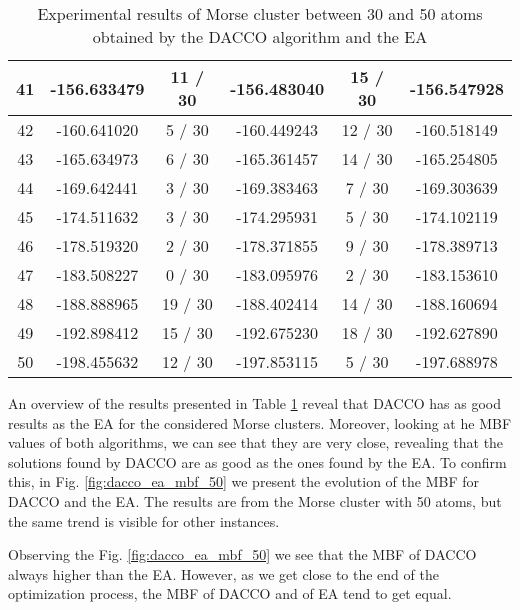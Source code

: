\begin{table}[!htdp]
\begin{center}
\begin{tabular}{| c | c | c | c | c | c |}
						41 & -156.633479 & 11 / 30 & -156.483040 & 15 / 30 & -156.547928 \\ \hline
						42 & -160.641020 & 5 / 30 & -160.449243 & 12 / 30 & -160.518149 \\ \hline
						43 & -165.634973 & 6 / 30 & -165.361457 & 14 / 30 & -165.254805 \\ \hline
						44 & -169.642441 & 3 / 30 & -169.383463 & 7 / 30 & -169.303639 \\ \hline
						45 & -174.511632 & 3 / 30 & -174.295931 & 5 / 30 & -174.102119 \\ \hline
						46 & -178.519320 & 2 / 30 & -178.371855 & 9 / 30 & -178.389713 \\ \hline
						47 & -183.508227 & 0 / 30 & -183.095976 & 2 / 30 & -183.153610 \\ \hline
						48 & -188.888965 & 19 / 30 & -188.402414 & 14 / 30 & -188.160694 \\ \hline
						49 & -192.898412 & 15 / 30 & -192.675230 & 18 / 30 & -192.627890 \\ \hline
						50 & -198.455632 & 12 / 30 & -197.853115 & 5 / 30 & -197.688978 \\ \hline
					\end{tabular}
				\end{center}
				\caption{Experimental results of Morse cluster between 30 and 50 atoms obtained by the DACCO algorithm and the EA}
				\label{tab:dacco_vs_ea}
			\end{table}
			
			An overview of the results presented in Table \ref{tab:dacco_vs_ea} reveal that DACCO has as good results as the EA for the considered Morse clusters. Moreover, looking at he MBF values of both algorithms, we can see that they are very close, revealing that the solutions found by DACCO are as good as the ones found by the EA. To confirm this, in Fig. \ref{fig:dacco_ea_mbf_50} we present the evolution of the MBF for DACCO and the EA. The results are from the Morse cluster with 50 atoms, but the same trend is visible for other instances. 
			
			
			Observing the Fig. \ref{fig:dacco_ea_mbf_50} we see that the MBF of DACCO always higher than the EA. However, as we get close to the end of the optimization process, the MBF of DACCO and of EA tend to get equal.
			
